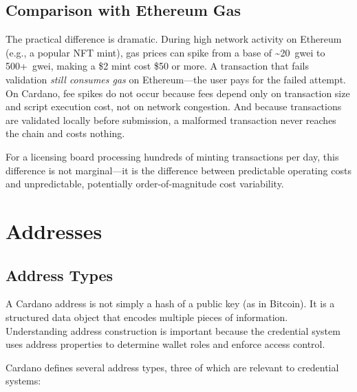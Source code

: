 \subsection{Comparison with Ethereum Gas}

The practical difference is dramatic. During high network activity on
Ethereum (e.g., a popular NFT mint), gas prices can spike from a base of
\textasciitilde20~gwei to 500+~gwei, making a \$2 mint cost \$50 or
more. A transaction that fails validation \emph{still consumes gas} on
Ethereum---the user pays for the failed attempt. On Cardano, fee spikes
do not occur because fees depend only on transaction size and script
execution cost, not on network congestion. And because transactions are
validated locally before submission, a malformed transaction never
reaches the chain and costs nothing.

For a licensing board processing hundreds of minting transactions per
day, this difference is not marginal---it is the difference between
predictable operating costs and unpredictable, potentially order-of-magnitude cost variability.


\section{Addresses}
\label{sec:addresses}

\subsection{Address Types}

A Cardano address is not simply a hash of a public key (as in Bitcoin).
It is a structured data object that encodes multiple pieces of
information. Understanding address construction is important because the
credential system uses address properties to determine wallet roles and
enforce access control.

Cardano defines several address types, three of which are relevant to
credential systems:

